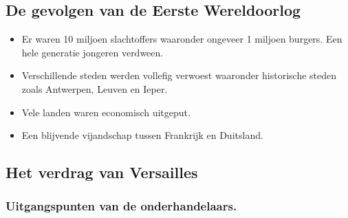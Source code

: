 \documentclass{article}
\begin{document}
\subsection{De gevolgen van de Eerste Wereldoorlog}
\begin{itemize}
    \item Er waren 10 miljoen slachtoffers waaronder ongeveer  1 miljoen burgers. Een hele generatie jongeren verdween.
    \item Verschillende steden werden vollefig verwoest waaronder historische steden zoals Antwerpen, Leuven en Ieper.
    \item Vele landen waren economisch uitgeput.
    \item Een blijvende vijandschap tussen Frankrijk en Duitsland.
\end{itemize}
\subsection{Het verdrag van Versailles}
\subsubsection{Uitgangspunten van de onderhandelaars.}
\end{document}
